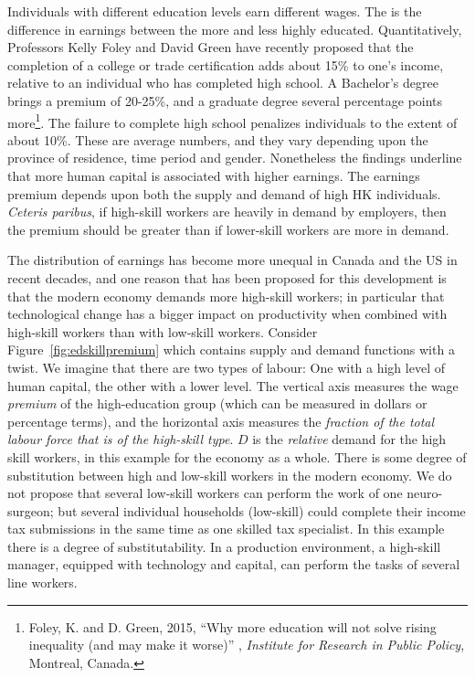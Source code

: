 Individuals with different education levels earn different wages. The %
 is the difference in earnings between the
more and less highly educated. Quantitatively, Professors Kelly Foley and
David Green have recently proposed that the completion of a college or trade
certification adds about 15\% to one's income, relative to an individual who
has completed high school. A Bachelor's degree brings a premium of 20-25\%,
and a graduate degree several percentage points more\footnote{Foley, K. and D. Green, 2015, 
``Why more education will not solve rising inequality (and may make it worse)'' , 
\textit{Institute for Research in Public Policy}, Montreal, Canada.}. The failure to
complete high school penalizes individuals to the extent of about 10\%.
These are average numbers, and they vary depending upon the province of
residence, time period and gender. Nonetheless the findings underline that
more human capital is associated with higher earnings. The earnings premium
depends upon both the supply and demand of high HK individuals. 
\textit{Ceteris paribus}, if high-skill workers are heavily in demand by employers,
then the premium should be greater than if lower-skill workers are more in
demand.

The distribution of earnings has become more unequal in Canada and the US in
recent decades, and one reason that has been proposed for this development
is that the modern economy demands more high-skill workers; in particular
that technological change has a bigger impact on productivity when combined
with high-skill workers than with low-skill workers. Consider Figure~\ref{fig:edskillpremium}
which contains supply and demand functions with a
twist. We imagine that there are two types of labour: One with a high level
of human capital, the other with a lower level. The vertical axis measures
the wage \textit{premium} of the high-education group (which can be measured
in dollars or percentage terms), and the horizontal axis measures the 
\textit{fraction of the total labour force that is of the high-skill type}. 
$D$ is the \textit{relative} demand for the high skill workers, in this
example for the economy as a whole. There is some degree of substitution
between high and low-skill workers in the modern economy. We do not propose
that several low-skill workers can perform the work of one neuro-surgeon;
but several individual households (low-skill) could complete their income tax
submissions in the same time as one skilled tax specialist. In this example
there is a degree of substitutability. In a production environment, a
high-skill manager, equipped with technology and capital, can perform the
tasks of several line workers.

